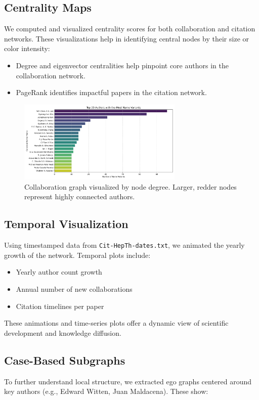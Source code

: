 \documentclass[12pt]{article}
\begin{document}
\subsection{Centrality Maps}
We computed and visualized centrality scores for both collaboration and citation networks. These visualizations help in identifying central nodes by their size or color intensity:

\begin{itemize}
    \item Degree and eigenvector centralities help pinpoint core authors in the collaboration network.
    \item PageRank identifies impactful papers in the citation network.
\end{itemize}

\begin{figure}[H]
    \centering
    \includegraphics[width=0.7\textwidth]{pictures/top_author_name_variants.png}
    \caption{Collaboration graph visualized by node degree. Larger, redder nodes represent highly connected authors.}
\end{figure}

\subsection{Temporal Visualization}
Using timestamped data from \texttt{Cit-HepTh-dates.txt}, we animated the yearly growth of the network. Temporal plots include:

\begin{itemize}
    \item Yearly author count growth
    \item Annual number of new collaborations
    \item Citation timelines per paper
\end{itemize}

These animations and time-series plots offer a dynamic view of scientific development and knowledge diffusion.

\subsection{Case-Based Subgraphs}
To further understand local structure, we extracted ego graphs centered around key authors (e.g., Edward Witten, Juan Maldacena). These show:
\end{document}
